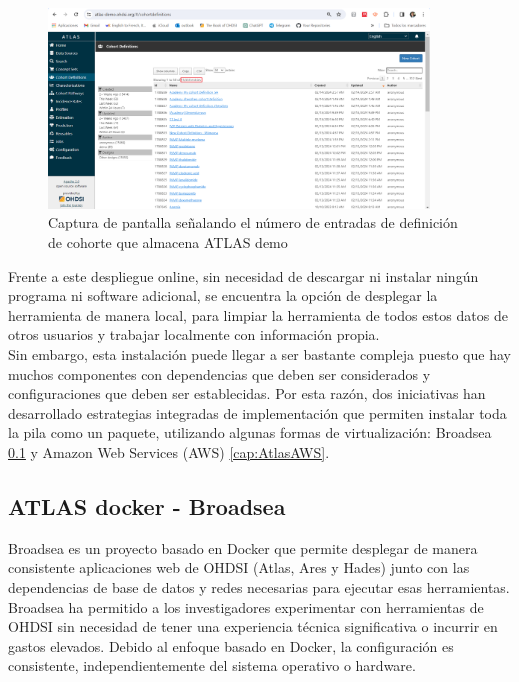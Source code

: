 \documentclass{article}
\begin{document}
\begin{figure}[H]
    \centering
    \includegraphics[width=0.90\textwidth]{images/atlasDemo(2).png}
    \caption{Captura de pantalla señalando el número de entradas de definición de cohorte que almacena ATLAS demo}
\end{figure}


Frente a este despliegue online, sin necesidad de descargar ni instalar ningún programa ni software adicional, se encuentra la opción de desplegar la herramienta de manera local, para limpiar la herramienta de todos estos datos de otros usuarios y trabajar localmente con información propia. \\

Sin embargo, esta instalación puede llegar a ser bastante compleja puesto que hay muchos componentes con dependencias que deben ser considerados y configuraciones que deben ser establecidas. Por esta razón, dos iniciativas han desarrollado estrategias integradas de implementación que permiten instalar toda la pila como un paquete, utilizando algunas formas de virtualización: Broadsea \ref{cap:AtlasBroadsea} y Amazon Web Services (AWS) \ref{cap:AtlasAWS}. \cite{TheBookOfOhdsi}

\newpage
\subsection{ATLAS docker - Broadsea}\label{cap:AtlasBroadsea}

Broadsea es un proyecto basado en Docker que permite desplegar de manera consistente aplicaciones web de OHDSI (Atlas, Ares y Hades) junto con las dependencias de base de datos y redes necesarias para ejecutar esas herramientas. Broadsea ha permitido a los investigadores experimentar con herramientas de OHDSI sin necesidad de tener una experiencia técnica significativa o incurrir en gastos elevados. Debido al enfoque basado en Docker, la configuración es consistente, independientemente del sistema operativo o hardware.  \cite{Broadsea3.0}
\end{document}
